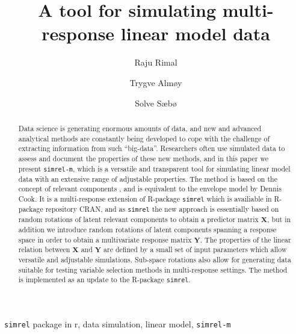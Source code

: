 \documentclass[3p,times,12pt,authoryear]{elsarticle}
\theoremstyle{definition}
\theoremstyle{definition}
\theoremstyle{remark}
\begin{document}
\begin{frontmatter}

  \title{A tool for simulating multi-response linear model data}
  
    \author[KBM]{Raju Rimal}
    \author[KBM]{Trygve Almøy}
  
    \author[NMBU]{Solve Sæbø}
  
      \address[KBM]{Faculty of Chemistry and Bioinformatics, Norwegian University of Life
Sciences, Ås, Norway}
    \address[NMBU]{Prorector, Norwegian University of Life Sciences, Ås, Norway}
  
  \begin{abstract}
  Data science is generating enormous amounts of data, and new and
  advanced analytical methods are constantly being developed to cope with
  the challenge of extracting information from such ``big-data''.
  Researchers often use simulated data to assess and document the
  properties of these new methods, and in this paper we present
  \texttt{simrel-m}, which is a versatile and transparent tool for
  simulating linear model data with an extensive range of adjustable
  properties. The method is based on the concept of relevant components
  \citep{helland1994comparison}, and is equivalent to the envelope model
  by Dennis Cook. It is a multi-response extension of R-package
  \texttt{simrel} which is availiable in R-package repository CRAN, and as
  \texttt{simrel} the new approach is essentially based on random
  rotations of latent relevant components to obtain a predictor matrix
  \(\mathbf{X}\), but in addition we introduce random rotations of latent
  components spanning a response space in order to obtain a multivariate
  response matrix \(\mathbf{Y}\). The properties of the linear relation
  between \(\mathbf{X}\) and \(\mathbf{Y}\) are defined by a small set of
  input parameters which allow versatile and adjustable simulations.
  Sub-space rotations also allow for generating data suitable for testing
  variable selection methods in multi-response settings. The method is
  implemented as an update to the R-package \texttt{simrel}.
  \end{abstract}
   \begin{keyword} \texttt{simrel} package in r, data simulation, linear model,
\texttt{simrel-m}\end{keyword}

\end{frontmatter}
\end{document}
